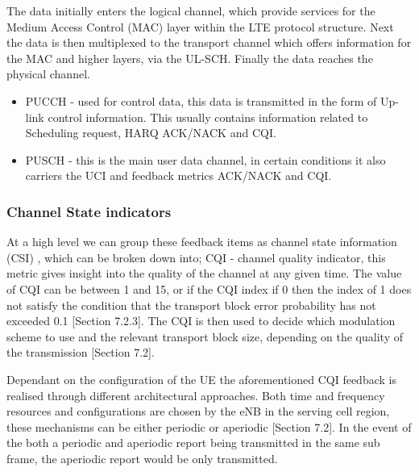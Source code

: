 \documentclass{article}
\begin{document}
The data initially enters the logical channel, which provide services for the Medium Access Control (MAC) layer within the LTE protocol structure. Next the data is then multiplexed to the transport channel which offers information for the MAC and higher layers, via the UL-SCH. Finally the data reaches the physical channel. 

\begin{itemize}
    \item PUCCH - used for control data, this data is transmitted in the form of Up-link control information. This usually contains information related to Scheduling request, HARQ ACK/NACK and CQI. 
    \item PUSCH - this is the main user data channel, in certain conditions it also carriers the UCI and feedback metrics ACK/NACK and CQI.
\end{itemize}

\subsubsection{Channel State indicators}
At a high level we can group these feedback items as channel state information (CSI) , which can be broken down into;
CQI - channel quality indicator, this metric gives insight into the quality of the channel at any given time. The value of CQI can be between 1 and 15, or if the CQI index if 0 then the index of 1 does not satisfy the condition that the transport block error probability has not exceeded 0.1 \cite{ETSITS136213}[Section 7.2.3]. The CQI is then used to decide which modulation scheme to use and the relevant transport block size, depending on the quality of the transmission \cite{ETSITS136213}[Section 7.2]. 

Dependant on the configuration of the UE the aforementioned CQI feedback is realised through different architectural approaches. Both time and frequency resources and configurations are chosen by the eNB in the serving cell region, these mechanisms can be either periodic or aperiodic \cite{ETSITS136213}[Section 7.2]. In the event of the both a periodic and aperiodic report being transmitted in the same sub frame, the aperiodic report would be only transmitted. 
\end{document}

